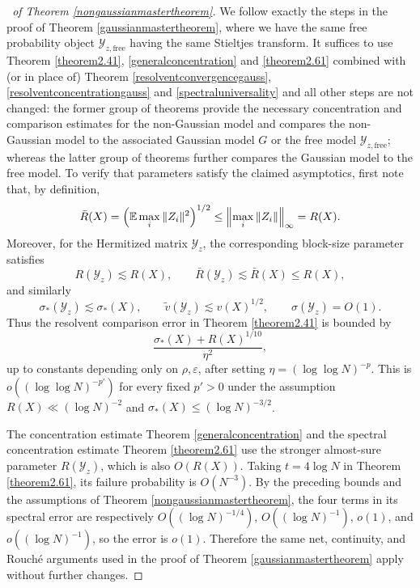 \documentclass[11pt,reqno]{amsart}
\theoremstyle{plain}
\theoremstyle{remark}
\numberwithin{equation}{section}
\begin{document}
\begin{proof}[\proofname\ of Theorem \ref{nongaussianmastertheorem}] We follow exactly the steps in the proof of Theorem \ref{gaussianmastertheorem}, where we have the same free probability object $\mathcal{Y}_{z,\text{free}}$ having the same Stieltjes transform. It suffices to use Theorem \ref{theorem2.41}, \ref{generalconcentration} and \ref{theorem2.61} combined with (or in place of) Theorem \ref{resolventconvergencegauss}, \ref{resolventconcentrationgauss} and \ref{spectraluniversality} and all other steps are not changed: the former group of theorems provide the necessary concentration and comparison estimates for the non-Gaussian model and compares the non-Gaussian model to the associated Gaussian model $G$ or the free model $\mathcal{Y}_{z,\text{free}}$; whereas the latter group of theorems further compares the Gaussian model to the free model. To verify that parameters satisfy the claimed asymptotics, first note that, by definition,
\[
\bar R(X)=\Bigl(\mathbb E\max_i\|Z_i\|^2\Bigr)^{1/2}
\le \Bigl\|\max_i\|Z_i\|\Bigr\|_\infty=R(X).
\]
Moreover, for the Hermitized matrix \(\mathcal{Y}_z\), the corresponding block-size parameter
satisfies
\[
R(\mathcal{Y}_z)\lesssim R(X),\qquad \bar R(\mathcal{Y}_z)\lesssim \bar R(X)\le R(X),
\]
and similarly
\[
\sigma_*(\mathcal{Y}_z)\lesssim \sigma_*(X),\qquad
\widetilde {v}(\mathcal{Y}_z)\lesssim v(X)^{1/2},\qquad
\sigma(\mathcal{Y}_z)=O(1).
\]
Thus the resolvent comparison error in Theorem \ref{theorem2.41} is bounded by
\[
\frac{\sigma_*(X)+R(X)^{1/10}}{\eta^2},
\]
up to constants depending only on \(\rho,\varepsilon\), after setting
\(\eta=(\log\log N)^{-p}\). This is \(o((\log\log N)^{-p'})\) for every fixed \(p'>0\)
under the assumption \(R(X)\ll(\log N)^{-2}\) and
\(\sigma_*(X)\le(\log N)^{-3/2}\).

The concentration estimate Theorem \ref{generalconcentration} and the spectral concentration estimate
Theorem \ref{theorem2.61} use the stronger almost-sure parameter \(R(\mathcal{Y}_z)\), which is also
\(O(R(X))\). Taking \(t=4\log N\) in Theorem \ref{theorem2.61}, its failure probability is
\(O(N^{-3})\). By the preceding bounds and the assumptions of Theorem
\ref{nongaussianmastertheorem}, the four terms in its spectral error are respectively
\(O((\log N)^{-1/4})\), \(O((\log N)^{-1})\), \(o(1)\), and
\(o((\log N)^{-1})\), so the error is \(o(1)\).
Therefore the same net, continuity, and Rouché arguments used in the
proof of Theorem \ref{gaussianmastertheorem} apply without further changes. 
\end{proof}
\end{document}
